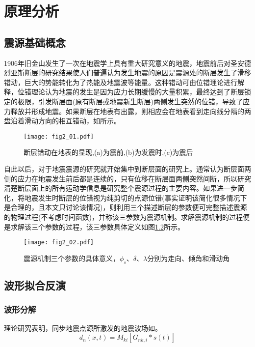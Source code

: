\chapter{原理分析}

\section{震源基础概念}
1906年旧金山发生了一次在地震学上具有重大研究意义的地震，地震前后对圣安德烈亚斯断层的研究结果\citep{Milne1910}使人们普遍认为发生地震的原因是震源处的断层发生了滑移错动，巨大的势能转化为了热能及地震波等能量。这种错动可由位错理论进行解释，位错理论认为地震的发生是因为应力长期缓慢的大量积累，最终达到了断层锁定的极限，引发断层面(原有断层或地震新生断层)两侧发生突然的位错，导致了应力释放并形成地震。如果断层在地表有出露，则相应会在地表看到走向线分隔的两盘沿着滑动方向的相互错动，如所示。
\begin{figure}
\centering
  \texttt{[image: fig2\_01.pdf]} 
  \caption{断层错动在地表的显现,(a)为震前,(b)为发震时,(c)为震后\citep{Stein2003}}
  \label{fig2_01}
\end{figure}

自此以后，对于地震震源的研究就开始集中到断层面的研究上。通常认为断层面两侧的应力在地震发生前后都是连续的，只有位移在断层面两侧突然间断，所以研究清楚断层面上的所有运动学信息是研究整个震源过程的主要内容。如果进一步简化，将地震发生时断层的位错视为纯剪切的点源位错(事实证明该简化很多情况下是合理的，且本文只讨论该情况)，则利用三个描述断层的参数便可完整描述震源的物理过程(不考虑时间函数)，并称该三参数为震源机制。求解震源机制的过程便是求解该三个参数的过程，该三参数具体定义如图\ref{fig2_02}所示。
\begin{figure}
\centering
  \texttt{[image: fig2\_02.pdf]} 
  \caption{震源机制三个参数的具体意义，$\phi_s$、$\delta$、$\lambda$分别为走向、倾角和滑动角\citep{chengwanzheng2006}}
  \label{fig2_02}
\end{figure}

\section{波形拟合反演}

\subsection{波形分解}
理论研究表明，同步地震点源\citep{Silver1982}所激发的地震波场如\citep{Jost1989}。
\begin{equation}
\label{eq2_01}
d_n(x,t)=M_{ki}[G_{nk,i}*s(t)]
\end{equation}

